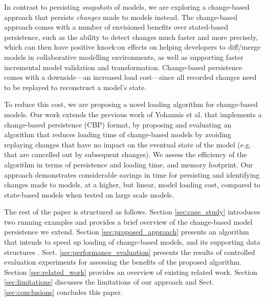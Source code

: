 \documentclass{llncs}
\begin{document}
In contrast to persisting \textit{snapshots} of models, we are exploring a change-based approach that persists \textit{changes} made to models instead. The change-based approach comes with a number of envisioned benefits over stated-based persistence, such as the ability to detect changes much faster and more precisely, which can then have positive knock-on effects on helping developers to diff/merge models in collaborative modelling environments, as well as supporting faster incremental model validation and transformation. Change-based persistence comes with a downside---an increased load cost---since all recorded changes need to be replayed to reconstruct a model's state.   

To reduce this cost, we are proposing a novel loading algorithm for change-based models. Our work extends the previous work of Yohannis et al. \cite{yohannis2017turning} that implements a change-based persistence (CBP) format, by proposing and evaluating an algorithm that reduces loading time of change-based models by avoiding replaying changes that have no impact on the eventual state of the model (e.g. that are cancelled out by subsequent changes). We assess the efficiency of the algorithm in terms of persistence and loading time, and memory footprint. Our approach demonstrates considerable savings in time for persisting and identifying changes made to models, at a higher, but linear, model loading cost, compared to state-based models when tested on large scale models. 

The rest of the paper is structured as follows. Section \ref{sec:case_study} introduces two running examples and provides a brief overview of the change-based model persistence we extend. Section \ref{sec:proposed_approach} presents an algorithm that intends to speed up loading of change-based models, and its supporting data structures .  Sect. \ref{sec:performance_evaluation} presents the results of controlled evaluation experiments for assessing the benefits of the proposed algorithm. Section \ref{sec:related_work} provides an overview of existing related work. Section \ref{sec:limitations} discusses the limitations of our approach and Sect. \ref{sec:conclusions} concludes this paper.
\end{document}
